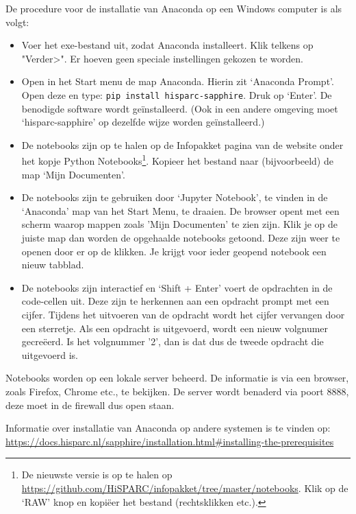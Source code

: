 De procedure voor de installatie van Anaconda op een Windows computer is als volgt:

\begin{itemize}
\item Voer het exe-bestand uit, zodat Anaconda installeert. Klik telkens op "Verder>". Er hoeven geen speciale instellingen gekozen te worden.
\item Open in het Start menu de map Anaconda. Hierin zit `Anaconda Prompt'. Open deze en type: {\tt pip install hisparc-sapphire}. Druk op `Enter'. De benodigde \hisparc software wordt geïnstalleerd. (Ook in een andere \python omgeving moet `hisparc-sapphire' op dezelfde wijze worden geïnstalleerd.)
\item De notebooks zijn op te halen op de Infopakket pagina van de \hisparc website onder het kopje Python Notebooks\footnote{De nieuwste versie is op te halen op \url{https://github.com/HiSPARC/infopakket/tree/master/notebooks}. Klik op de `RAW' knop en kopiëer het bestand (rechtsklikken etc.).}. Kopieer het bestand naar (bijvoorbeeld) de map `Mijn Documenten'.
\item De notebooks zijn te gebruiken door `Jupyter Notebook', te vinden in de `Anaconda' map van het Start Menu, te draaien. De browser opent met een scherm waarop mappen zoals 'Mijn Documenten' te zien zijn. Klik je op de juiste map dan worden de opgehaalde notebooks getoond. Deze zijn weer te openen door er op de klikken. Je krijgt voor ieder geopend notebook een nieuw tabblad.
\item De notebooks zijn interactief en `Shift + Enter' voert de opdrachten in de code-cellen uit. Deze zijn te herkennen aan een opdracht prompt met een cijfer. Tijdens het uitvoeren van de opdracht wordt het cijfer vervangen door een sterretje. Als een opdracht is uitgevoerd, wordt een nieuw volgnumer gecreëerd. Is het volgnummer '2', dan is dat dus de tweede opdracht die uitgevoerd is.
\end{itemize}

Notebooks worden op een lokale server beheerd. De informatie is via een browser, zoals Firefox, Chrome etc., te bekijken.
De server wordt benaderd via poort 8888, deze moet in de firewall dus open staan.

Informatie over installatie van Anaconda op andere systemen is te vinden op: \url{https://docs.hisparc.nl/sapphire/installation.html#installing-the-prerequisites}


